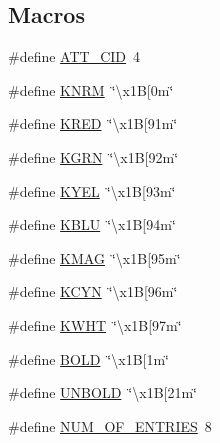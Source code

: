 \subsection*{Macros}
\begin{DoxyCompactItemize}
\item 
\#define \mbox{\hyperlink{piconet_2l2cap-server_8c_acd26973fe5a2cba0e34e0d81717c6bda}{A\+T\+T\+\_\+\+C\+ID}}~4
\item 
\#define \mbox{\hyperlink{piconet_2l2cap-server_8c_a137aa83ec74421d226a90c92ec032ac9}{K\+N\+RM}}~\char`\"{}\textbackslash{}x1B\mbox{[}0m\char`\"{}
\item 
\#define \mbox{\hyperlink{piconet_2l2cap-server_8c_a66290957baed5df3930ada4cb8caccf1}{K\+R\+ED}}~\char`\"{}\textbackslash{}x1B\mbox{[}91m\char`\"{}
\item 
\#define \mbox{\hyperlink{piconet_2l2cap-server_8c_ac081c83b067273757f7a2e54a5957d41}{K\+G\+RN}}~\char`\"{}\textbackslash{}x1B\mbox{[}92m\char`\"{}
\item 
\#define \mbox{\hyperlink{piconet_2l2cap-server_8c_a897b10d246533c95ba86cb79f92e465a}{K\+Y\+EL}}~\char`\"{}\textbackslash{}x1B\mbox{[}93m\char`\"{}
\item 
\#define \mbox{\hyperlink{piconet_2l2cap-server_8c_a3f838f2fc3a9a3b434be606fc908964b}{K\+B\+LU}}~\char`\"{}\textbackslash{}x1B\mbox{[}94m\char`\"{}
\item 
\#define \mbox{\hyperlink{piconet_2l2cap-server_8c_a6825f05d3b9d619d91d79d0ef18bb8b2}{K\+M\+AG}}~\char`\"{}\textbackslash{}x1B\mbox{[}95m\char`\"{}
\item 
\#define \mbox{\hyperlink{piconet_2l2cap-server_8c_a32036c94dbb166a3f874b7efc169841f}{K\+C\+YN}}~\char`\"{}\textbackslash{}x1B\mbox{[}96m\char`\"{}
\item 
\#define \mbox{\hyperlink{piconet_2l2cap-server_8c_af0036c8022c9980079ab17e5c87fd478}{K\+W\+HT}}~\char`\"{}\textbackslash{}x1B\mbox{[}97m\char`\"{}
\item 
\#define \mbox{\hyperlink{piconet_2l2cap-server_8c_a26cdbb1a00213c810caccf21cd33a631}{B\+O\+LD}}~\char`\"{}\textbackslash{}x1B\mbox{[}1m\char`\"{}
\item 
\#define \mbox{\hyperlink{piconet_2l2cap-server_8c_a126e0efbf8aec03b757d2b41bfcd8382}{U\+N\+B\+O\+LD}}~\char`\"{}\textbackslash{}x1B\mbox{[}21m\char`\"{}
\item 
\#define \mbox{\hyperlink{piconet_2l2cap-server_8c_ad78f502d163a08832b5f96b987a05eb0}{N\+U\+M\+\_\+\+O\+F\+\_\+\+E\+N\+T\+R\+I\+ES}}~8
\end{DoxyCompactItemize}
